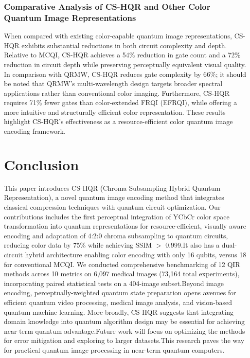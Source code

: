 \documentclass[11pt,a4paper]{article}
\begin{document}
\subsubsection{Comparative Analysis of CS-HQR and Other Color Quantum Image Representations}
When compared with existing color-capable quantum image representations, CS-HQR exhibits substantial reductions in both circuit complexity and depth. Relative to MCQI, CS-HQR achieves a 54\% reduction in gate count and a 72\% reduction in circuit depth while preserving perceptually equivalent visual quality. In comparison with QRMW, CS-HQR reduces gate complexity by 66\%; it should be noted that QRMW’s multi-wavelength design targets broader spectral applications rather than conventional color imaging. Furthermore, CS-HQR requires 71\% fewer gates than color-extended FRQI (EFRQI), while offering a more intuitive and structurally efficient color representation. These results highlight CS-HQR’s effectiveness as a resource-efficient color quantum image encoding framework.


\section{Conclusion}
\label{sec:conclusion}
This paper introduces CS-HQR (Chroma Subsampling Hybrid Quantum Representation), a novel quantum image encoding method that integrates classical compression techniques with quantum circuit optimization. Our contributions includes the first perceptual integration of YCbCr color space transformation into quantum representations for resource-efficient, visually aware encoding and adaptation of 4:2:0 chroma subsampling to quantum circuits, reducing color data by 75\%  while achieving SSIM $>$ 0.999.It also has a dual-circuit hybrid architecture enabling color encoding with only 16 qubits, versus 18 for conventional MCQI. We conducted comprehensive benchmarking of 12 QIR methods across 10 metrics on 6,097 medical images (73,164 total experiments), incorporating paired statistical tests on a 404-image subset.Beyond image encoding, perceptually-weighted quantum state preparation opens avenues for efficient quantum video processing, medical image analysis, and vision-based quantum machine learning. More broadly, CS-HQR suggests that integrating domain knowledge into quantum algorithm design may be essential for achieving near-term quantum advantage.Future work will focus on optimizing the methods for error mitigation and exploring to larger datasets.This  research paves the way for practical quantum image processing in near-term quantum computers. 
%
\end{document}
